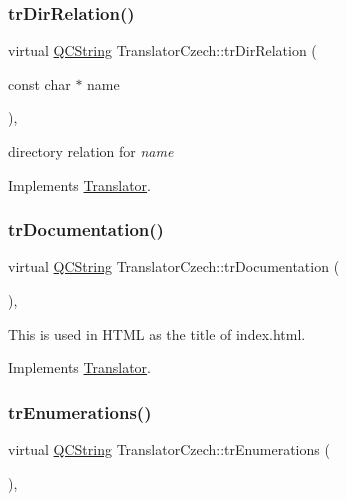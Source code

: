 \subsubsection{\texorpdfstring{trDirRelation()}{trDirRelation()}}
{\footnotesize\ttfamily virtual \mbox{\hyperlink{class_q_c_string}{Q\+C\+String}} Translator\+Czech\+::tr\+Dir\+Relation (\begin{DoxyParamCaption}\item[{const char $\ast$}]{name }\end{DoxyParamCaption})\hspace{0.3cm}{\ttfamily [inline]}, {\ttfamily [virtual]}}

directory relation for {\itshape name} 

Implements \mbox{\hyperlink{class_translator}{Translator}}.

\mbox{\label{class_translator_czech_aebe8cad7bd80207a444b50188fcb3662}} 
\subsubsection{\texorpdfstring{trDocumentation()}{trDocumentation()}}
{\footnotesize\ttfamily virtual \mbox{\hyperlink{class_q_c_string}{Q\+C\+String}} Translator\+Czech\+::tr\+Documentation (\begin{DoxyParamCaption}{ }\end{DoxyParamCaption})\hspace{0.3cm}{\ttfamily [inline]}, {\ttfamily [virtual]}}

This is used in H\+T\+ML as the title of index.\+html. 

Implements \mbox{\hyperlink{class_translator}{Translator}}.

\mbox{\label{class_translator_czech_a7597a73b9db5085ddd9521fd259785bf}} 
\subsubsection{\texorpdfstring{trEnumerations()}{trEnumerations()}}
{\footnotesize\ttfamily virtual \mbox{\hyperlink{class_q_c_string}{Q\+C\+String}} Translator\+Czech\+::tr\+Enumerations (\begin{DoxyParamCaption}{ }\end{DoxyParamCaption})\hspace{0.3cm}{\ttfamily [inline]}, {\ttfamily [virtual]}}

